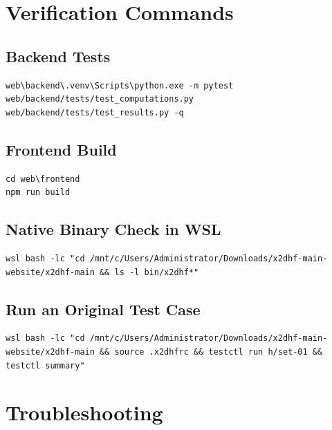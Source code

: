 \documentclass[11pt,a4paper]{article}
\begin{document}
\section{Verification Commands}

\subsection{Backend Tests}

\begin{lstlisting}[style=xcmd]
web\backend\.venv\Scripts\python.exe -m pytest web/backend/tests/test_computations.py web/backend/tests/test_results.py -q
\end{lstlisting}

\subsection{Frontend Build}

\begin{lstlisting}[style=xcmd]
cd web\frontend
npm run build
\end{lstlisting}

\subsection{Native Binary Check in WSL}

\begin{lstlisting}[style=xcmd]
wsl bash -lc "cd /mnt/c/Users/Administrator/Downloads/x2dhf-main-website/x2dhf-main && ls -l bin/x2dhf*"
\end{lstlisting}

\subsection{Run an Original Test Case}

\begin{lstlisting}[style=xcmd]
wsl bash -lc "cd /mnt/c/Users/Administrator/Downloads/x2dhf-main-website/x2dhf-main && source .x2dhfrc && testctl run h/set-01 && testctl summary"
\end{lstlisting}

\section{Troubleshooting}
\end{document}
